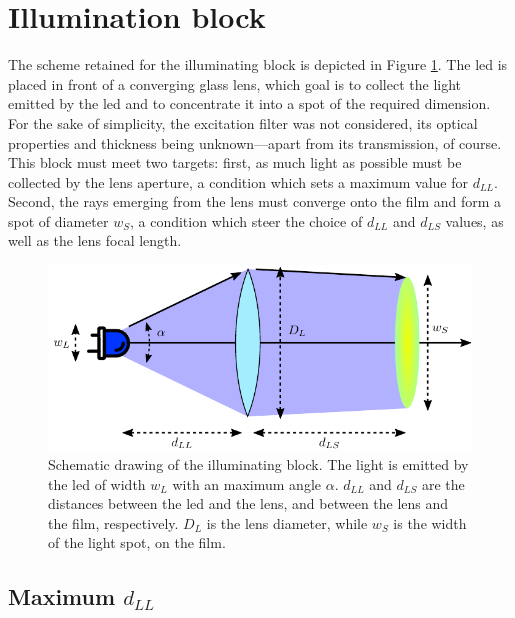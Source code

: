 \section{Illumination block}

The scheme retained for the illuminating block is depicted in Figure \ref{anfig:optics:illuminating_th}. The \gls{led} is placed in front of a converging glass lens, which goal is to collect the light emitted by the \gls{led} and to concentrate it into a spot of the required dimension. For the sake of simplicity, the excitation filter was not considered, its optical properties and thickness being unknown---apart from its transmission, of course. This block must meet two targets: first, as much light as possible must be collected by the lens aperture, a condition which sets a maximum value for $d_{LL}$. Second, the rays emerging from the lens must converge onto the film and form a spot of diameter $w_S$, a condition which steer the choice of $d_{LL}$ and $d_{LS}$ values, as well as the lens focal length.

\begin{figure}
	\centering
	\includegraphics{2_appendices/optical_figures/illuminating_th_converted.pdf}
	\caption[Schematic drawing of the illuminating block.]{Schematic drawing of the illuminating block. The light is emitted by the \gls{led} of width $w_L$ with an maximum angle $\alpha$. $d_{LL}$ and $d_{LS}$ are the distances between the \gls{led} and the lens, and between the lens and the film, respectively. $D_L$ is the lens diameter, while $w_S$ is the width of the light spot, on the film.}
	\label{anfig:optics:illuminating_th}
\end{figure}

\subsection{Maximum \texorpdfstring{$d_{LL}$}{dLL}}\label{ansect:optics:maxdll}

